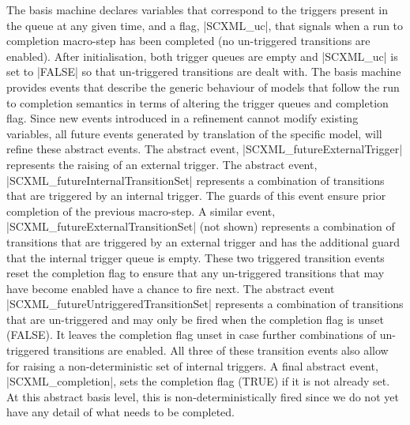 The basis machine declares variables 
that correspond to the triggers present in the queue at any given time, and a flag, |SCXML_uc|, that signals when a run to completion macro-step has been completed (no un-triggered transitions are enabled). 
After initialisation, both trigger queues are empty and |SCXML_uc| is set to |FALSE| so that un-triggered transitions are dealt with. 
The basis machine provides events that describe the generic behaviour of models that follow the run to completion semantics in terms of altering the trigger queues and completion flag.
Since new events introduced in a refinement cannot modify existing variables, all future events generated by translation of the specific \SCXML model, will refine these abstract events.
The abstract event, |SCXML_futureExternalTrigger| represents the raising of an external trigger.    
The abstract event, |SCXML_futureInternalTransitionSet| represents a combination of transitions that are triggered by an internal trigger. 
The guards of this event ensure prior completion of the previous macro-step. 
A similar event, |SCXML_futureExternalTransitionSet| (not shown) represents a combination of transitions that are triggered by an external trigger and has the additional guard that the internal trigger queue is empty.
These two triggered transition events reset the completion flag to ensure that any un-triggered transitions that may have become enabled have a chance to fire next.
The abstract event |SCXML_futureUntriggeredTransitionSet| represents a combination of transitions that are un-triggered and may only be fired when the completion flag is unset (FALSE).
It leaves the completion flag unset in case further combinations of un-triggered transitions are enabled.
All three of these transition events also allow for raising a non-deterministic set of internal triggers.
A final abstract event, |SCXML_completion|, sets the completion flag (TRUE) if it is not already set. At this abstract basis level, this is non-deterministically fired since we do not yet have any detail of what needs to be completed.

